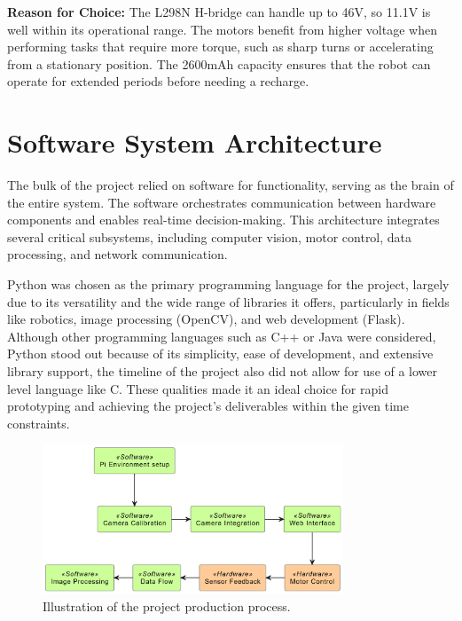 \textbf{Reason for Choice:} The L298N H-bridge can handle up to 46V, so 11.1V is well within its operational range. The motors benefit from higher voltage when performing tasks that require more torque, such as sharp turns or accelerating from a stationary position. The 2600mAh capacity ensures that the robot can operate for extended periods before needing a recharge.
	

\section{\label{sec:software} Software System Architecture}

The bulk of the project relied on software for functionality, serving as the brain of the entire system. The software orchestrates communication between hardware components and enables real-time decision-making. This architecture integrates several critical subsystems, including computer vision, motor control, data processing, and network communication.

Python was chosen as the primary programming language for the project, largely due to its versatility and the wide range of libraries it offers, particularly in fields like robotics, image processing (OpenCV), and web development (Flask). Although other programming languages such as C++ or Java were considered, Python stood out because of its simplicity, ease of development, and extensive library support, the timeline of the project also did not allow for use of a lower level language like C. These qualities made it an ideal choice for rapid prototyping and achieving the project’s deliverables within the given time constraints.


\begin{figure}[H]
	\centering
	
	\centering
	\includegraphics[width=0.8\textwidth]{ch4/figs/hi.png}
	\caption{Illustration of the project production process.}
	\label{fig:process}
\end{figure}

